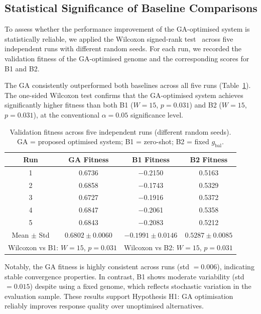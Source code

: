 \documentclass[mathematics,article,xetex,moreauthors]{Definitions/mdpi}
\begin{document}
\subsection{Statistical Significance of Baseline Comparisons}
\label{sec:significance}

To assess whether the performance improvement of the GA-optimised system is
statistically reliable, we applied the Wilcoxon signed-rank test~\cite{wilcoxon1945}
across five independent runs with different random seeds. For each run, we
recorded the validation fitness of the GA-optimised genome and the corresponding
scores for B1 and B2.

The GA consistently outperformed both baselines across all five runs
(Table~\ref{tab:significance}). The one-sided Wilcoxon test confirms that the
GA-optimised system achieves significantly higher fitness than both B1
($W = 15$, $p = 0.031$) and B2 ($W = 15$, $p = 0.031$), at the conventional
$\alpha = 0.05$ significance level.

\begin{table}[H]
\centering
\caption{Validation fitness across five independent runs (different random
seeds). GA = proposed optimised system; B1 = zero-shot; B2 = fixed $g_\mathrm{bal}$.}
\label{tab:significance}
\begin{tabular}{cccc}
\hline
\textbf{Run} & \textbf{GA Fitness} & \textbf{B1 Fitness} & \textbf{B2 Fitness} \\
\hline
1 & 0.6736 & $-$0.2150 & 0.5163 \\
2 & 0.6858 & $-$0.1743 & 0.5329 \\
3 & 0.6727 & $-$0.1916 & 0.5372 \\
4 & 0.6847 & $-$0.2061 & 0.5358 \\
5 & 0.6843 & $-$0.2083 & 0.5212 \\
\hline
Mean $\pm$ Std & $0.6802 \pm 0.0060$ & $-0.1991 \pm 0.0146$ & $0.5287 \pm 0.0085$ \\
\hline
\multicolumn{2}{l}{Wilcoxon vs B1: $W=15$, $p=0.031$} &
\multicolumn{2}{r}{Wilcoxon vs B2: $W=15$, $p=0.031$} \\
\hline
\end{tabular}
\end{table}

Notably, the GA fitness is highly consistent across runs (std $= 0.006$),
indicating stable convergence properties. In contrast, B1 shows moderate
variability (std $= 0.015$) despite using a fixed genome, which reflects
stochastic variation in the evaluation sample. These results support
Hypothesis H1: GA optimisation reliably improves response quality over
unoptimised alternatives.
\end{document}
